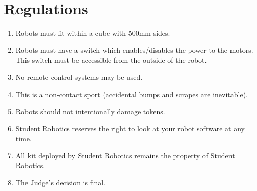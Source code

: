 \section {Regulations}
\label{regs}

\begin{enumerate}
\item Robots must fit within a cube with 500mm sides.
\item Robots must have a switch which enables/disables the power to the motors.  This switch must be accessible from the outside of the robot.
\item No remote control systems may be used.
\item This is a non-contact sport (accidental bumps and scrapes are inevitable).
\item Robots should not intentionally damage tokens.
\item Student Robotics reserves the right to look at your robot software at any time.
\item All kit deployed by Student Robotics remains the property of Student Robotics.
\item The Judge's decision is final.
\end{enumerate}
